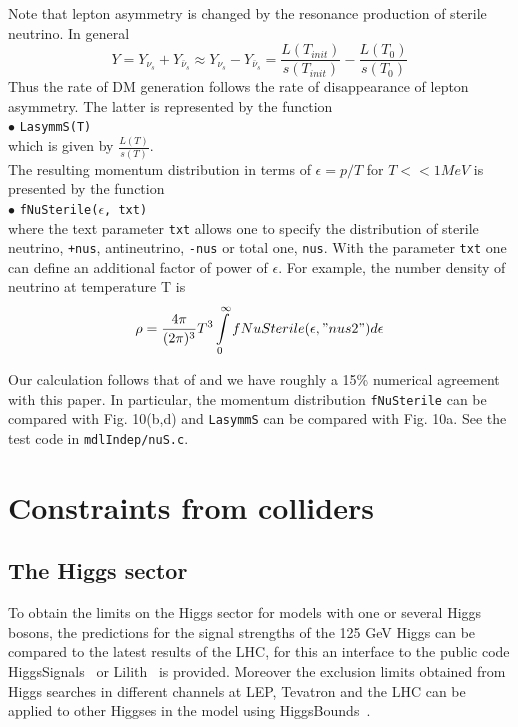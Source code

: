 \documentclass[12pt,a4paper]{article}
\begin{document}
Note that lepton asymmetry is changed by the  resonance production of sterile neutrino. In general 
\begin{equation} 
  Y=Y_{\nu_s}+Y_{\bar{\nu}_s} \approx Y_{\nu_s} - Y_{\bar{\nu}_s} = \frac{L(T_{init})}{s(T_{init})} - \frac{L(T_0)}{s(T_0)}  
\end{equation}
Thus the rate of DM generation follows the  rate of disappearance of lepton asymmetry. The latter is represented 
by the function \\ 
$\bullet$ \verb|LasymmS(T)|\\
which is given by $\frac{L(T)}{s(T)}$.  \\
The resulting momentum distribution   in terms of 
$\epsilon=p/T$  for $T << 1MeV$  is presented by the function \\
\noindent
$\bullet$ \verb|fNuSterile(|$\epsilon$\verb|, txt)|\\   
where the text parameter {\tt txt}  allows one  to specify the distribution of sterile neutrino, {\tt +nus}, antineutrino,  {\tt -nus} or 
total one, {\tt nus}.   With the parameter  {\tt txt} one can define an additional factor of power 
of $\epsilon$. 
 For example, the number density of neutrino at temperature T is 
\begin{equation}
   \rho= \frac{4\pi}{(2\pi)^3} T^3 \int\limits_0^\infty fNuSterile(\epsilon,"nus2") d\epsilon  
\end{equation} 
 


Our calculation follows that of \cite{Venumadhav_2016} and we have roughly a 15\%   numerical  agreement  with this paper. In particular,  the  momentum distribution  {\tt fNuSterile} can be compared with Fig. 10(b,d)  and {\tt LasymmS} can be compared with Fig. 10a.  See 
the test code  in {\tt mdlIndep/nuS.c}.  





 

\section{Constraints from colliders}

\subsection{The Higgs sector}
\label{sec:Higgs}
To obtain the  limits on the Higgs sector for models with one or several Higgs bosons, the predictions for the signal strengths of the 125 GeV Higgs  can be
compared  to the latest results of the LHC, for this an interface to the public code HiggsSignals~\cite{Bechtle:2013xfa} or Lilith~\cite{Bernon:2015hsa,Kraml:2019sis,Bertrand:2020lyb} is provided.
Moreover the exclusion limits obtained from Higgs searches in different channels at LEP, Tevatron and the LHC can be applied to other Higgses in the model using 
HiggsBounds~\cite{Bechtle:2013wla}. 
\end{document}
